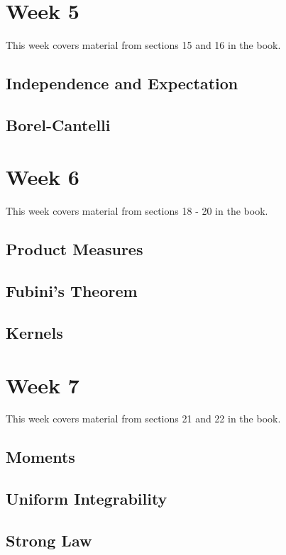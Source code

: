 \documentclass[12pt]{article}
\begin{document}
\section{Week 5}
This week covers material from sections 15 and 16 in the book.

\subsection{Independence and Expectation}

\subsection{Borel-Cantelli}


\section{Week 6}
This week covers material from sections 18 - 20 in the book.

\subsection{Product Measures}

\subsection{Fubini's Theorem}

\subsection{Kernels}


\section{Week 7}
This week covers material from sections 21 and 22 in the book.

\subsection{Moments}

\subsection{Uniform Integrability}

\subsection{Strong Law}
\end{document}
